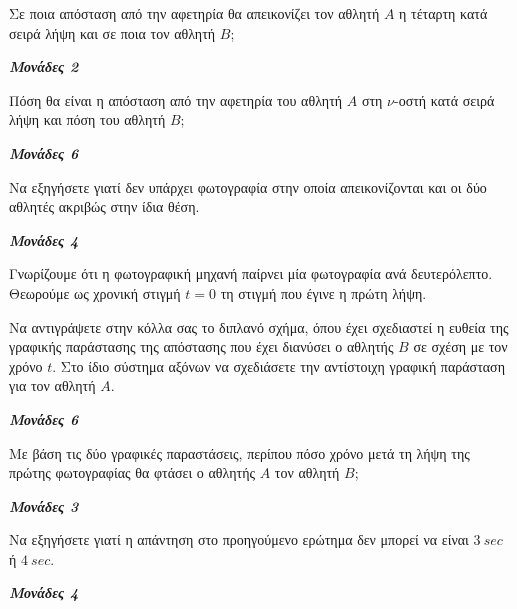 \documentclass[11pt,a4paper,twoside]{book}
\newcommand{\monades}[1]{
\hspace*{\fill}
\textbf{\textit{\textcolor{maincolor}{Μονάδες #1}}}}
\begin{document}
\begin{alist}
\item Σε ποια απόσταση από την αφετηρία θα απεικονίζει τον αθλητή $A$ η τέταρτη κατά σειρά λήψη και σε ποια τον αθλητή $B$;
\monades{2}
\item Πόση θα είναι η απόσταση από την αφετηρία του αθλητή $A$ στη $\nu$-οστή κατά σειρά λήψη και πόση του αθλητή $B$;
\monades{6}
\item Να εξηγήσετε γιατί δεν υπάρχει φωτογραφία στην οποία απεικονίζονται και οι δύο αθλητές ακριβώς στην ίδια θέση.
\monades{4}
\item Γνωρίζουμε ότι η φωτογραφική μηχανή παίρνει μία φωτογραφία ανά δευτερόλεπτο. Θεωρούμε ως χρονική στιγμή $t = 0$ τη στιγμή που έγινε η πρώτη λήψη.

\begin{rlist}
\item Να αντιγράψετε στην κόλλα σας το διπλανό σχήμα, όπου έχει σχεδιαστεί η ευθεία της γραφικής παράστασης της απόστασης που έχει διανύσει ο αθλητής $B$ σε σχέση με τον χρόνο $t$. Στο ίδιο σύστημα αξόνων να σχεδιάσετε την αντίστοιχη γραφική παράσταση για τον αθλητή $A$.

\begin{marginfigure}

\end{marginfigure}
\monades{6}
\item Με βάση τις δύο γραφικές παραστάσεις, περίπου πόσο χρόνο μετά τη λήψη της πρώτης φωτογραφίας θα φτάσει ο αθλητής $A$ τον αθλητή $B$;
\monades{3}
\item Να εξηγήσετε γιατί η απάντηση στο προηγούμενο ερώτημα δεν μπορεί να είναι $3\ sec$ ή $4\ sec$.
\monades{4}
\end{rlist}
\end{alist}

\vspace{4mm}
\end{document}
